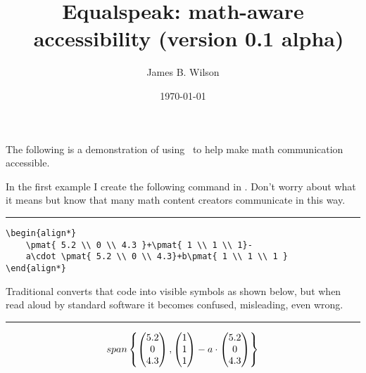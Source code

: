\documentclass[presentation,aspectratio=169]{beamer}
\title{Equalspeak: math-aware \LaTeXe ~accessibility (version 0.1 alpha)}
\author{James B. Wilson}
\date{\today}
\begin{document}
    
    
\begin{frame}
    \titlepage
\end{frame}
\begin{frame}
    The following is a demonstration of using \LaTeXe ~to 
    help make math communication accessible.
\end{frame}

\begin{frame}[fragile]
   In the first example I create the following command in \LaTeXe.
   Don't worry about what it means but know that many math content 
   creators communicate in this way.\\
   \rule{\textwidth}{1pt}
\begin{lstlisting}
\begin{align*}
    \pmat{ 5.2 \\ 0 \\ 4.3 }+\pmat{ 1 \\ 1 \\ 1}-
    a\cdot \pmat{ 5.2 \\ 0 \\ 4.3}+b\pmat{ 1 \\ 1 \\ 1 }
\end{align*}    
\end{lstlisting}    
            
\end{frame}

\begin{frame}
Traditional \LaTeXe converts that code into visible symbols 
as shown below, but when read aloud by standard software 
it becomes confused, misleading, even wrong.\\
\rule{\textwidth}{1pt}
\begin{align*}
    span\left\{\begin{pmatrix}  5.2 \\ 0 \\ 4.3  \end{pmatrix}, \begin{pmatrix}  1 \\ 1 \\ 1 \end{pmatrix}-
    a\cdot \begin{pmatrix}  5.2 \\ 0 \\ 4.3 \end{pmatrix}\right\}
\end{align*}    
\end{frame}
\end{document}
